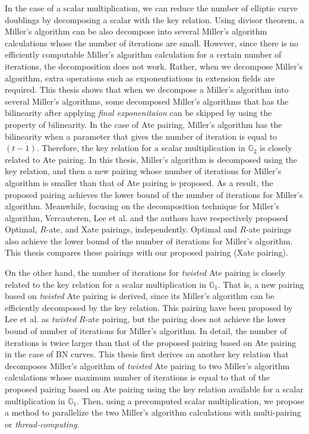 In the case of a scalar multiplication, we can reduce the number of elliptic curve doublings by decomposing a scalar with the key relation.
Using divisor theorem, a Miller's algorithm can be also decompose into several Miller's algorithm calculations whose the number of iterations are small.
However, since there is no efficiently computable Miller's algorithm calculation for a certain number of iterations, the decomposition does not work.  
Rather, when we decompose Miller's algorithm, extra operations such as exponentiations in extension fields are required.
This thesis shows that when we decompose a Miller's algorithm into several Miller's algorithms, some decomposed Miller's algorithms that has the bilinearity after applying {\it final exponenitaion} can be skipped by using the property of bilinearity.
In the case of Ate pairing, Miller's algorithm has the bilinearity when a parameter that gives the number of iteration is equal to $(t-1)$.
Therefore, the key relation for a scalar multiplication in $\mathbb{G}_2$ is closely related to Ate pairing.
In this thesis, Miller's algorithm is decomposed using the key relation, and then a new pairing whose number of iterations for Miller's algorithm is smaller than that of Ate pairing is proposed.
As a result, the proposed pairing achieves the lower bound of the number of iterations for Miller's algorithm.
Meanwhile, focusing on the decomposition technique for Miller's algorithm, Vercauteren, Lee et al. and the authors have respectively proposed Optimal, $R$-ate, and Xate pairings, independently.
Optimal and $R$-ate pairings also achieve the lower bound of the number of iterations for Miller's algorithm.
This thesis compares these pairings with our proposed pairing (Xate pairing).

On the other hand, the number of iterations for {\it twisted} Ate pairing is closely related to the key relation for a scalar multiplication in $\mathbb{G}_1$.
That is, a new pairing based on {\it twisted} Ate pairing is derived, since its Miller's algorithm can be efficiently decomposed by the key relation. 
This pairing have been proposed by Lee et al. as {\it twisted} $R$-ate pairing, but the pairing does not achieve the lower bound of number of iterations for Miller's algorithm.
In detail, the number of iterations is twice larger than that of the proposed pairing based on Ate pairing in the case of BN curves.
This thesis first derives an another key relation that decomposes Miller's algorithm of {\it twisted} Ate pairing to two Miller's algorithm calculations whose maximum number of iterations is equal to that of the proposed pairing based on Ate pairing using the key relation available for a scalar multiplication in $\mathbb{G}_1$.
Then, using a precomputed scalar multiplication, we propose a method to parallelize the two Miller's algorithm calculations with multi-pairing or {\it thread-computing}. 

